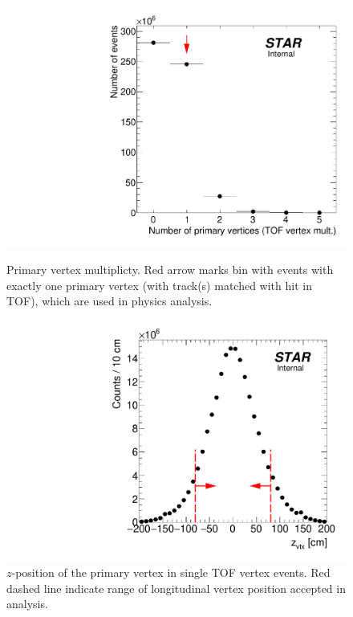 \begin{figure}[ht!]%
\centering%
\begin{minipage}{.4725\textwidth}%
  \centering%
  \includegraphics[width=\linewidth]{graphics/eventSelection/NumberOfPrimaryVertices.pdf}%
  \caption{Primary vertex multiplicty. Red arrow marks bin with events with exactly one primary vertex (with track(s) matched with hit in TOF), which are used in physics analysis.}\label{fig:NumberOfPrimaryVertices}
\end{minipage}%
\quad\quad%
\begin{minipage}{.4725\textwidth}%
  \centering
  \includegraphics[width=\linewidth]{graphics/eventSelection/zVertex_oneTof.pdf}%
  \caption{\texorpdfstring{$z$}{z}-position of the primary vertex in single TOF vertex events. Red dashed line indicate range of longitudinal vertex position accepted in analysis.\newline}\label{fig:zVertexTpc}
\end{minipage}%
\end{figure}%


